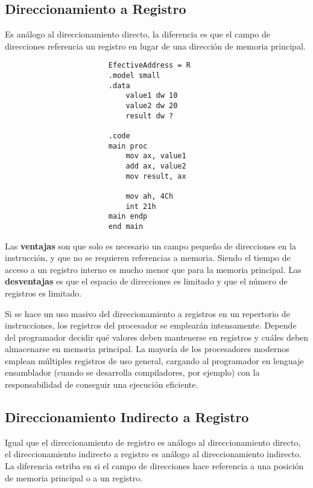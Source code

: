 \documentclass{article}
\begin{document}
\subsection*{Direccionamiento a Registro}
Es an\'{a}logo al direccionamiento directo, la diferencia es que el campo de
direcciones referencia un registro en lugar de una direcci\'{o}n de memoria
principal.

\begin{verbatim}
                        EfectiveAddress = R
                        .model small
                        .data
                            value1 dw 10
                            value2 dw 20
                            result dw ?

                        .code
                        main proc
                            mov ax, value1
                            add ax, value2
                            mov result, ax

                            mov ah, 4Ch
                            int 21h
                        main endp
                        end main
\end{verbatim}

Las \textbf{ventajas} son que solo es necesario un campo peque\~{n}o de
direcciones en la instrucci\'{o}n, y que no se requieren referencias a memoria.
Siendo el tiempo de acceso a un registro interno es mucho menor que para la
memoria principal. Las \textbf{desventajas} es que el espacio de direcciones
es limitado y que el n\'{u}mero de registros es limitado.

Si se hace un uso masivo del direccionamiento a registros en un repertorio de
instrucciones, los registros del procesador se emplear\'{a}n intensamente.
Depende del programador decidir qu\'{e} valores deben mantenerse en registros
y cu\'{a}les deben almacenarse en memoria principal. La mayor\'{i}a de los
procesadores modernos emplean m\'{u}ltiples registros de uso general, cargando
al programador en lenguaje ensamblador (cuando se desarrolla compiladores,
por ejemplo) con la responsabilidad de conseguir una ejecuci\'{o}n eficiente.

\subsection*{Direccionamiento Indirecto a Registro}
Igual que el direccionamiento de registro es an\'{a}logo al direccionamiento
directo, el direccionamiento indirecto a registro es an\'{a}logo al
direccionamiento indirecto. La diferencia estriba en si el campo de direcciones
hace referencia a una posici\'{o}n de memoria principal o a un registro.
\end{document}
